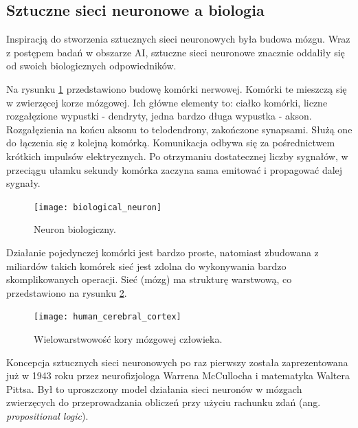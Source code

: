 \documentclass[a4paper,12pt]{article}
\numberwithin{figure}{section}
\begin{document}
    \subsection{Sztuczne sieci neuronowe a biologia}

    Inspiracją do stworzenia sztucznych sieci neuronowych była budowa mózgu. Wraz z postępem badań w obszarze AI, sztuczne sieci neuronowe znacznie oddaliły się od swoich biologicznych odpowiedników\cite{UczenieMaszynowe2018}.

    \bigskip

    Na rysunku \ref{fig:biological_neuron} przedstawiono budowę komórki nerwowej. Komórki te mieszczą się w zwierzęcej korze mózgowej. Ich główne elementy to: ciałko komórki, liczne rozgałęzione wypustki - dendryty, jedna bardzo długa wypustka - akson. Rozgałęzienia na końcu aksonu to telodendrony, zakończone synapsami. Służą one do łączenia się z kolejną komórką. Komunikacja odbywa się za pośrednictwem krótkich impulsów elektrycznych. Po otrzymaniu dostatecznej liczby sygnałów, w przeciągu ułamku sekundy komórka zaczyna sama emitować i propagować dalej sygnały\cite{UczenieMaszynowe2018}.

    \bigskip

    \begin{figure}[H]
        \centering
        \texttt{[image: biological\_neuron]}
        \caption{Neuron biologiczny\cite{UczenieMaszynowe2018}.}
        \label{fig:biological_neuron}
    \end{figure}

    \bigskip

    Działanie pojedynczej komórki jest bardzo proste, natomiast zbudowana z miliardów takich komórek sieć jest zdolna do wykonywania bardzo skomplikowanych operacji. Sieć (mózg) ma strukturę warstwową, co przedstawiono na rysunku \ref{fig:human_cerebral_cortex}\cite{UczenieMaszynowe2018}.

    \bigskip

    \begin{figure}[H]
        \centering
        \texttt{[image: human\_cerebral\_cortex]}
        \caption{Wielowarstwowość kory mózgowej człowieka\cite{UczenieMaszynowe2018}.}
        \label{fig:human_cerebral_cortex}
    \end{figure}

    \bigskip

    Koncepcja sztucznych sieci neuronowych po raz pierwszy została zaprezentowana już w 1943 roku przez neurofizjologa Warrena McCullocha i matematyka Waltera Pittsa\cite{BeginningsOfANN1943}. Był to uproszczony model działania sieci neuronów w mózgach zwierzęcych do przeprowadzania obliczeń przy użyciu rachunku zdań (ang. \textit{propositional logic})\cite{UczenieMaszynowe2018}.
\end{document}
